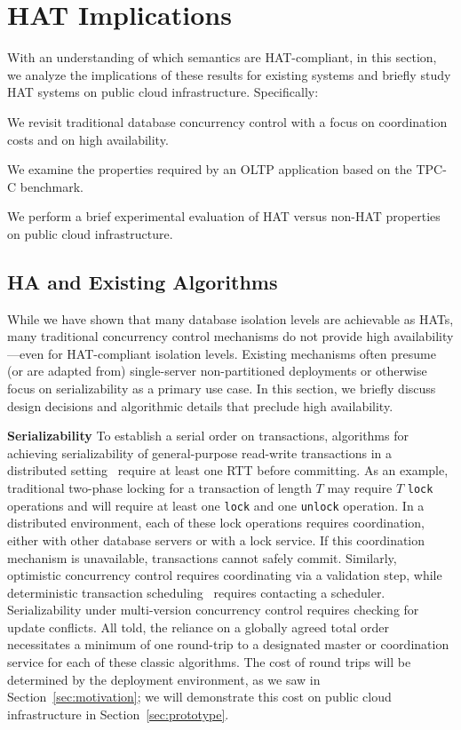 
\section{HAT Implications}
\label{sec:evaluation}

With an understanding of which semantics are HAT-compliant, in this
section, we analyze the implications of these results for existing
systems and briefly study HAT systems on public cloud
infrastructure. Specifically:
\begin{myenumerate}
\item We revisit traditional database concurrency control with a focus
  on coordination costs and on high availability.
\item We examine the properties required by an OLTP application based
  on the TPC-C benchmark.
\item We perform a brief experimental evaluation of HAT versus non-HAT
  properties on public cloud infrastructure.
\end{myenumerate}

\subsection{HA and Existing Algorithms}
\label{sec:eval-existing}

While we have shown that many database isolation levels are achievable
as HATs, many traditional concurrency control mechanisms do not
provide high availability---even for HAT-compliant isolation
levels. Existing mechanisms often presume (or are adapted from)
single-server non-partitioned deployments or otherwise focus on
serializability as a primary use case. In this section, we briefly
discuss design decisions and algorithmic details that preclude high
availability.

\vspace{.5em}\noindent\textbf{Serializability} To establish a serial
order on transactions, algorithms for achieving serializability of
general-purpose read-write transactions in a distributed
setting~\cite{bernstein-book, davidson-survey}
require at least one RTT before committing. As an
example, traditional two-phase locking for a transaction of length $T$
may require $T$ \texttt{lock} operations and will require at least one
\texttt{lock} and one \texttt{unlock} operation.  In a distributed
environment, each of these lock operations requires coordination,
either with other database servers or with a lock service. If this
coordination mechanism is unavailable, transactions cannot safely
commit. Similarly, optimistic concurrency control requires
coordinating via a validation step, while deterministic transaction
scheduling~\cite{deterministic-scheduling} requires contacting a
scheduler. Serializability under multi-version concurrency control
requires checking for update conflicts. All told, the reliance on a
globally agreed total order necessitates a minimum of one round-trip
to a designated master or coordination service for each of these
classic algorithms.  The cost of round trips will be determined by the
deployment environment, as we saw in Section~\ref{sec:motivation}; we
will demonstrate this cost on public cloud infrastructure in
Section~\ref{sec:prototype}.

